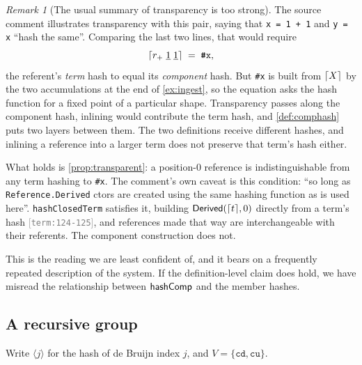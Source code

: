 \documentclass[11pt]{article}
\theoremstyle{definition}
\theoremstyle{plain}
\theoremstyle{remark}
\newtheorem{remark}{Remark}[section]
\newcommand{\src}[1]{{\footnotesize\textcolor{gray}{[\texttt{#1}]}}}
\begin{document}
\begin{remark}[The usual summary of transparency is too strong]\label{rem:transparency-limit}
The source comment illustrates transparency with this pair, saying that \texttt{x = 1 + 1} and
\texttt{y = x} ``hash the same''. Comparing the last two lines, that would require
\[
  \lceil r_{+}\;\underline{1}\;\underline{1} \rceil \;=\; \texttt{\#x} ,
\]
the referent's \emph{term} hash to equal its \emph{component} hash. But \texttt{\#x} is built from
$\lceil X \rceil$ by the two accumulations at the end of \cref{ex:ingest}, so the equation asks the hash
function for a fixed point of a particular shape. Transparency passes along the component hash,
inlining would contribute the term hash, and \cref{def:comphash} puts two layers between them. The
two definitions receive different hashes, and inlining a reference into a larger term does not
preserve that term's hash either.

What holds is \cref{prop:transparent}: a position-$0$ reference is indistinguishable from any term
hashing to \texttt{\#x}. The comment's own caveat is this condition: ``so long as
\texttt{Reference.Derived} ctors are created using the same hashing function as is used here''.
\texttt{hashClosedTerm} satisfies it, building $\mathsf{Derived}(\lceil t \rceil,0)$ directly from a term's hash
\src{term:124-125}, and references made that way are interchangeable with their referents. The
component construction does not.

This is the reading we are least confident of, and it bears on a frequently repeated description of
the system. If the definition-level claim does hold, we have misread the relationship between
$\mathsf{hashComp}$ and the member hashes.
\end{remark}

\subsection{A recursive group}\label{ex:cycle}

Write $\langle j \rangle$ for the hash of de Bruijn index $j$, and $V = \{\texttt{cd},\texttt{cu}\}$.
\end{document}
